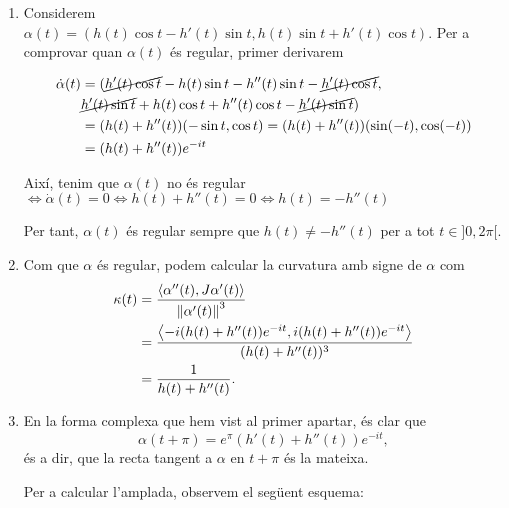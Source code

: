 \documentclass[a4paper, 11pt]{article}
\begin{document}
  \begin{solution}
    \begin{enumerate}[label=(\alph*)]
      \item Considerem $\alpha(t)=(h(t) \cos t - h'(t) \sin t, h(t) \sin t + h'(t) \cos t)$.
      Per a comprovar quan $\alpha(t)$ és regular, primer derivarem
      
      \begin{align*}
      \dot{\alpha}(t) &= (\cancel{h'(t)\cos t} - h(t)\sin t -h''(t) \sin t - \cancel{h'(t)\cos t}, \\
      &
                           \cancel{h'(t) \sin t} + h(t)\cos t + h''(t)\cos t - \cancel{h'(t) \sin t})\\
      &= (h(t)+h''(t))(-\sin t, \cos t) = (h(t)+h''(t))(\sin (-t), \cos (-t))\\
      &= (h(t)+h''(t))e^{-it}
      \end{align*}
  
      Així, tenim que $\alpha(t)$ no és regular$\iff \dot{\alpha}(t) = 0 \iff h(t)+h''(t)=0 \iff h(t)=-h''(t)$ 
  
      Per tant, $\alpha(t)$ és regular sempre que $h(t) \neq -h''(t)$ per a tot $t \in ]0, 2\pi[$.
      \item Com que $\alpha$ és regular, podem calcular la curvatura amb signe de $\alpha$ com
      \[
        \begin{split}
          \kappa(t) &= \frac{\gen{\alpha''(t), J \alpha'(t)}}%
        {\norm{\alpha'(t)}^3} \\
        &= \frac{\gen{-i(h(t) + h''(t))e^{-it},%
        i(h(t) + h''(t))e^{-it}}}{(h(t) + h''(t))^3} \\
        &= \frac{1}{h(t) + h''(t)}.
        \end{split}
      \]
      \item En la forma complexa que hem vist al primer apartar, és clar
      que
      \[
        \alpha(t + \pi) = e^{\pi} (h'(t) + h''(t))e^{-it},
      \]
      és a dir, que la recta tangent a $\alpha$ en $t + \pi$ és la mateixa.

      Per a calcular l'amplada, observem el següent esquema:
      \begin{center}
\end{center}
\end{enumerate}
\end{solution}
\end{document}
